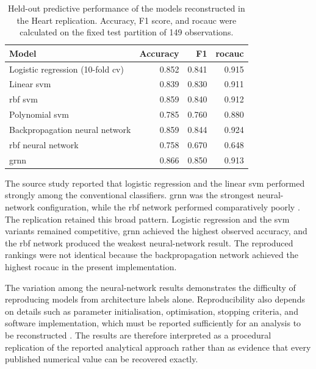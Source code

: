 \begin{table}[htbp]
    \centering
    \small
    \caption{Held-out predictive performance of the models reconstructed in the Heart replication. Accuracy, F1 score, and \gls{rocauc} were calculated on the fixed test partition of 149 observations.}
    \label{tab:heart_replication_results}
    \begin{tabular}{@{}lrrr@{}}
        \toprule
        \textbf{Model} & \textbf{Accuracy} & \textbf{F1} & \textbf{\gls{rocauc}} \\
        \midrule
        Logistic regression (10-fold \gls{cv}) & 0.852 & 0.841 & 0.915 \\
        Linear \gls{svm} & 0.839 & 0.830 & 0.911 \\
        \gls{rbf} \gls{svm} & 0.859 & 0.840 & 0.912 \\
        Polynomial \gls{svm} & 0.785 & 0.760 & 0.880 \\
        Backpropagation neural network & 0.859 & 0.844 & 0.924 \\
        \gls{rbf} neural network & 0.758 & 0.670 & 0.648 \\
        \gls{grnn} & 0.866 & 0.850 & 0.913 \\
        \bottomrule
    \end{tabular}
\end{table}

The source study reported that logistic regression and the linear \gls{svm} performed strongly among the conventional classifiers. \gls{grnn} was the strongest neural-network configuration, while the \gls{rbf} network performed comparatively poorly \citep{khanna_comparative_2015}. The replication retained this broad pattern. Logistic regression and the \gls{svm} variants remained competitive, \gls{grnn} achieved the highest observed accuracy, and the \gls{rbf} network produced the weakest neural-network result. The reproduced rankings were not identical because the backpropagation network achieved the highest \gls{rocauc} in the present implementation.

The variation among the neural-network results demonstrates the difficulty of reproducing models from architecture labels alone. Reproducibility also depends on details such as parameter initialisation, optimisation, stopping criteria, and software implementation, which must be reported sufficiently for an analysis to be reconstructed \citep{collins_tripodai_2024}. The results are therefore interpreted as a procedural replication of the reported analytical approach rather than as evidence that every published numerical value can be recovered exactly.

